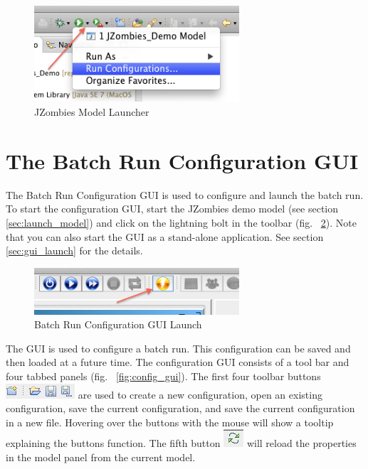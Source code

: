 \documentclass[11pt]{amsart}
\begin{document}
\begin{figure}[h]
\begin{center}
\vspace{.2in}
\centerline {
\includegraphics[width=3in]{images/zombies_launch.png}
}
\caption{JZombies Model Launcher}
\label{fig:launch}
\end{center}
\end{figure}

\section{The Batch Run Configuration GUI}
\label{sec:gui}
The  Batch Run Configuration GUI is used to configure and launch the batch run. To start the configuration GUI, start the JZombies demo model (see section \ref{sec:launch_model}) and click on the lightning bolt in the toolbar (fig. ~\ref{fig:gui_launch}). Note that you can also start the GUI as a stand-alone application. See section \ref{sec:gui_launch} for the details.

\begin{figure}[h]
\begin{center}
\vspace{.2in}
\centerline {
\includegraphics[width=3in]{images/gui_launch.png}
}
\caption{Batch Run Configuration GUI Launch}
\label{fig:gui_launch}
\end{center}
\end{figure}

The GUI is used to configure a batch run. This configuration can be saved and then loaded at a future time. The configuration GUI consists of a tool bar and four tabbed panels (fig. ~\ref{fig:config_gui}). The first four toolbar buttons \includegraphics[height=.2in]{images/gui_file_buttons.png} are used to create a new configuration, open an existing configuration, save the current configuration, and save the current configuration in a new file. Hovering over the buttons with the mouse will show a tooltip explaining the buttons function.  The fifth button \includegraphics[height=.2in]{images/reload_button.png} will reload the properties in the model panel from the current model. 
\end{document}
